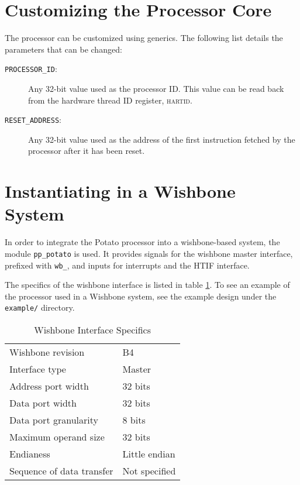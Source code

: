 \documentclass[12pt,a4paper]{report}
\newcommand{\register}[1]{\textsc{#1}}
\begin{document}
\section{Customizing the Processor Core}
The processor can be customized using generics. The following list details the parameters
that can be changed:

\begin{description}
	\item[\texttt{PROCESSOR\_ID}:] Any 32-bit value used as the processor ID. This value can
	be read back from the hardware thread ID register, \register{hartid}.
	\item[\texttt{RESET\_ADDRESS}:] Any 32-bit value used as the address of the first instruction
	fetched by the processor after it has been reset.
\end{description}

\section{Instantiating in a Wishbone System}
\label{sec:instantiating-wishbone}

In order to integrate the Potato processor into a wishbone-based system, the module \texttt{pp\_potato}
is used. It provides signals for the wishbone master interface, prefixed with \texttt{wb\_}, and
inputs for interrupts and the HTIF interface.

The specifics of the wishbone interface is listed in table \ref{tab:wishbone}. To see an example
of the processor used in a Wishbone system, see the example design under the \texttt{example/}
directory.

\begin{table}
	\centering
	\begin{tabular}{|l|l|}
		\hline
		Wishbone revision		& B4 \\
		Interface type			& Master \\
		Address port width		& 32 bits \\
		Data port width			& 32 bits \\
		Data port granularity		& 8 bits \\
		Maximum operand size		& 32 bits \\
		Endianess			& Little endian \\
		Sequence of data transfer	& Not specified \\
		\hline
	\end{tabular}
	\caption{Wishbone Interface Specifics}
	\label{tab:wishbone}
\end{table}
\end{document}
